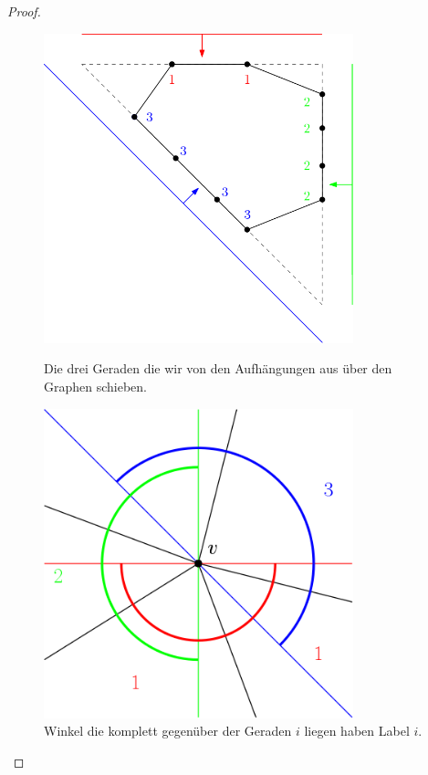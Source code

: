 \begin{proof}
\begin{figure}
\centering
\begin{minipage}{0.2\textwidth}
  \end{minipage}
  \begin{minipage}{0.45\textwidth}
  \centering
    \includegraphics[width=0.8\textwidth]{sweeplines1.png}
    \caption{Die drei Geraden die wir von den Aufhängungen aus über den Graphen schieben.}
    \label{sweeplines1}
  \end{minipage}
  \hfill
  \begin{minipage}{0.45\textwidth}
 \centering
    \includegraphics[width=0.8\textwidth]{sweeplines2.png}
    \caption{Winkel die komplett gegenüber der Geraden $i$ liegen haben Label $i$.}
    \label{sweeplines2}
  \end{minipage}
\end{figure}
\captionsetup{format=plain,labelsep=endash,justification=justified,width=1\textwidth}


\end{proof}
